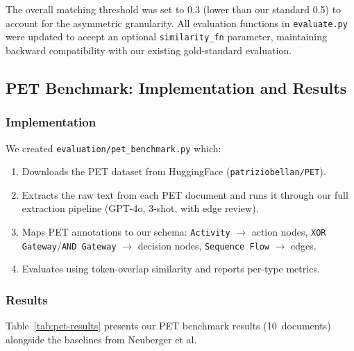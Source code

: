 \documentclass[12pt,a4paper]{article}
\begin{document}
The overall matching threshold was set to 0.3 (lower than our standard 0.5) to account for the asymmetric granularity. All evaluation functions in \texttt{evaluate.py} were updated to accept an optional \texttt{similarity\_fn} parameter, maintaining backward compatibility with our existing gold-standard evaluation.

\subsection{PET Benchmark: Implementation and Results}
\label{sec:pet-results}

\subsubsection{Implementation}

We created \texttt{evaluation/pet\_benchmark.py} which:
\begin{enumerate}[leftmargin=2em]
    \item Downloads the PET dataset from HuggingFace (\texttt{patriziobellan/PET}).
    \item Extracts the raw text from each PET document and runs it through our full extraction pipeline (GPT-4o, 3-shot, with edge review).
    \item Maps PET annotations to our schema: \texttt{Activity} $\rightarrow$ action nodes, \texttt{XOR Gateway}/\texttt{AND Gateway} $\rightarrow$ decision nodes, \texttt{Sequence Flow} $\rightarrow$ edges.
    \item Evaluates using token-overlap similarity and reports per-type metrics.
\end{enumerate}

\subsubsection{Results}

Table~\ref{tab:pet-results} presents our PET benchmark results (10~documents) alongside the baselines from Neuberger et al.
\end{document}
